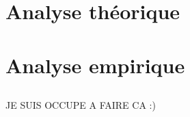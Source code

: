 





\section{Analyse théorique}
\subsection{} %
\subsection{} %
	
\subsection{} %
\subsection{} %
	
\subsection{} %

\section{Analyse empirique}
\subsection{} %
JE SUIS OCCUPE A FAIRE CA :) 
\subsection{} %
	


